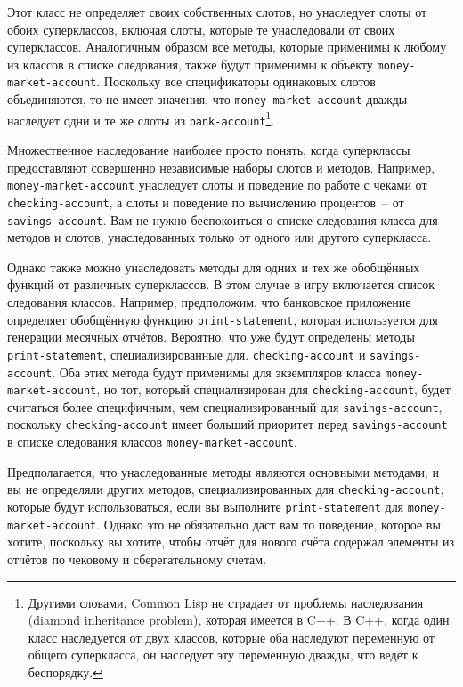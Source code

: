 Этот класс не определяет своих собственных слотов, но унаследует слоты от обоих
суперклассов, включая слоты, которые те унаследовали от своих суперклассов.  Аналогичным
образом все методы, которые применимы к любому из классов в списке следования, также
будут применимы к объекту \lstinline{money-market-account}.  Поскольку все спецификаторы
одинаковых слотов объединяются, то не имеет значения, что \lstinline{money-market-account}
дважды наследует одни и те же слоты из \lstinline{bank-account}\footnote{Другими словами,
  Common Lisp не страдает от проблемы наследования (diamond inheritance problem), которая
  имеется в C++.  В C++, когда один класс наследуется от двух классов, которые оба
  наследуют переменную от общего суперкласса, он наследует эту переменную дважды, что
  ведёт к беспорядку.}.

Множественное наследование наиболее просто понять, когда суперклассы предоставляют
совершенно независимые наборы слотов и методов.  Например, \lstinline{money-market-account}
унаследует слоты и поведение по работе с чеками от \lstinline{checking-account}, а слоты и
поведение по вычислению процентов~-- от \lstinline{savings-account}.  Вам не нужно беспокоиться
о списке следования класса для методов и слотов, унаследованных только от одного или
другого суперкласса.

Однако также можно унаследовать методы для одних и тех же обобщённых функций от
различных суперклассов.  В этом случае в игру включается список следования
классов.  Например, предположим, что банковское приложение определяет обобщённую функцию
\lstinline{print-statement}, которая используется для генерации месячных отчётов.  Вероятно,
что уже будут определены методы \lstinline{print-statement}, специализированные для.
\lstinline{checking-account} и \lstinline{savings-account}.  Оба этих метода будут применимы для
экземпляров класса \lstinline{money-market-account}, но тот, который специализирован для
\lstinline{checking-account}, будет считаться более специфичным, чем специализированный для
\lstinline{savings-account}, поскольку \lstinline{checking-account} имеет больший приоритет перед
\lstinline{savings-account} в списке следования классов \lstinline{money-market-account}.

Предполагается, что унаследованные методы являются основными методами, и вы не определяли
других методов, специализированных для \lstinline{checking-account}, которые будут
использоваться, если вы выполните \lstinline{print-statement} для \lstinline{money-market-account}.
Однако это не обязательно даст вам то поведение, которое вы хотите, поскольку вы хотите,
чтобы отчёт для нового счёта содержал элементы из отчётов по чековому и сберегательному
счетам.


